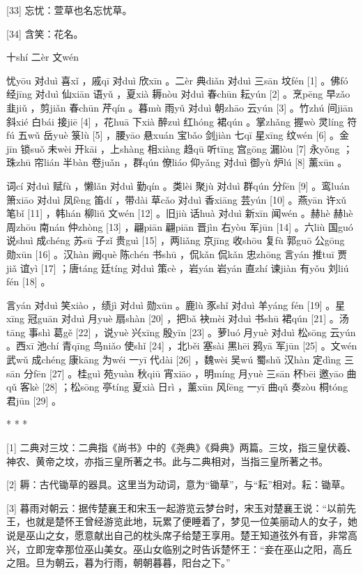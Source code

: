 \documentclass[12pt,UTF8]{ctexbook}
\begin{document}
[33] 忘忧：萱草也名忘忧草。

[34] 含笑：花名。





十shí 二èr 文wén


忧yōu 对duì 喜xǐ ，戚qī 对duì 欣xīn 。二èr 典diǎn 对duì 三sān 坟fén [1] 。佛fó 经jīng 对duì 仙xiān 语yǔ ，夏xià 耨nòu 对duì 春chūn 耘yún [2] 。烹pēng 早zǎo 韭jiǔ ，剪jiǎn 春chūn 芹qín 。暮mù 雨yǔ 对duì 朝zhāo 云yún [3] 。竹zhú 间jiān 斜xié 白bái 接jiē [4] ，花huā 下xià 醉zuì 红hóng 裙qún 。掌zhǎng 握wò 灵líng 符fú 五wǔ 岳yuè 箓lù [5] ，腰yāo 悬xuán 宝bǎo 剑jiàn 七qī 星xīng 纹wén [6] 。金jīn 锁suǒ 未wèi 开kāi ，上shàng 相xiàng 趋qū 听tīng 宫gōng 漏lòu [7] 永yǒng ；珠zhū 帘lián 半bàn 卷juǎn ，群qún 僚liáo 仰yǎng 对duì 御yù 炉lú [8] 薰xūn 。

词cí 对duì 赋fù ，懒lǎn 对duì 勤qín 。类lèi 聚jù 对duì 群qún 分fēn [9] 。鸾luán 箫xiāo 对duì 凤fèng 笛dí ，带dài 草cǎo 对duì 香xiāng 芸yún [10] 。燕yān 许xǔ 笔bǐ [11] ，韩hán 柳liǔ 文wén [12] 。旧jiù 话huà 对duì 新xīn 闻wén 。赫hè 赫hè 周zhōu 南nán 仲zhòng [13] ，翩piān 翩piān 晋jìn 右yòu 军jūn [14] 。六liù 国guó 说shuì 成chéng 苏sū 子zǐ 贵guì [15] ，两liǎng 京jīng 收shōu 复fù 郭guō 公gōng 勋xūn [16] 。汉hàn 阙què 陈chén 书shū ，侃kǎn 侃kǎn 忠zhōng 言yán 推tuī 贾jiǎ 谊yì [17] ；唐táng 廷tíng 对duì 策cè ，岩yán 岩yán 直zhí 谏jiàn 有yǒu 刘liú fén [18] 。

言yán 对duì 笑xiào ，绩jì 对duì 勋xūn 。鹿lù 豕shǐ 对duì 羊yáng fén [19] 。星xīng 冠guān 对duì 月yuè 扇shàn [20] ，把bǎ 袂mèi 对duì 书shū 裙qún [21] 。汤tāng 事shì 葛gě [22] ，说yuè 兴xīng 殷yīn [23] 。萝luó 月yuè 对duì 松sōng 云yún 。西xī 池chí 青qīng 鸟niǎo 使shǐ [24] ，北běi 塞sài 黑hēi 鸦yā 军jūn [25] 。文wén 武wǔ 成chéng 康kāng 为wéi 一yī 代dài [26] ，魏wèi 吴wú 蜀shǔ 汉hàn 定dìng 三sān 分fēn [27] 。桂guì 苑yuàn 秋qiū 宵xiāo ，明míng 月yuè 三sān 杯bēi 邀yāo 曲qǔ 客kè [28] ；松sōng 亭tíng 夏xià 日rì ，薰xūn 风fēng 一yī 曲qǔ 奏zòu 桐tóng 君jūn [29] 。



* * *



[1] 二典对三坟：二典指《尚书》中的《尧典》《舜典》两篇。三坟，指三皇伏羲、神农、黄帝之坟，亦指三皇所著之书。此与二典相对，当指三皇所著之书。

[2] 耨：古代锄草的器具。这里当为动词，意为“锄草”，与“耘”相对。耘：锄草。

[3] 暮雨对朝云：据传楚襄王和宋玉一起游览云梦台时，宋玉对楚襄王说：“以前先王，也就是楚怀王曾经游览此地，玩累了便睡着了，梦见一位美丽动人的女子，她说是巫山之女，愿意献出自己的枕头席子给楚王享用。楚王知道弦外有音，非常高兴，立即宠幸那位巫山美女。巫山女临别之时告诉楚怀王：“妾在巫山之阳，高丘之阻。旦为朝云，暮为行雨，朝朝暮暮，阳台之下。”
\end{document}
